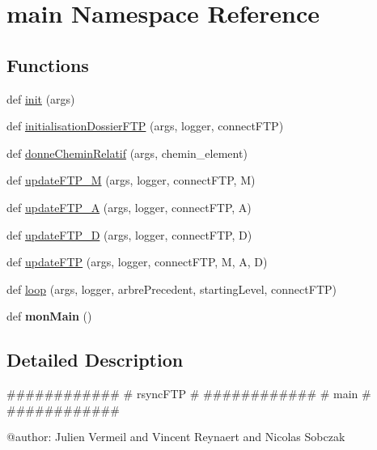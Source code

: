 \hypertarget{namespacemain}{}\section{main Namespace Reference}
\label{namespacemain}
\subsection*{Functions}
\begin{DoxyCompactItemize}
\item 
def \hyperlink{namespacemain_a0e290154722b65ed489c05ccb63123a4}{init} (args)
\item 
def \hyperlink{namespacemain_af2b805eecb08e493981427109e24bfb4}{initialisation\+Dossier\+F\+TP} (args, logger, connect\+F\+TP)
\item 
def \hyperlink{namespacemain_a00446ed819ceb3ba2a2efc386436b91c}{donne\+Chemin\+Relatif} (args, chemin\+\_\+element)
\item 
def \hyperlink{namespacemain_a72891f9d649c2f0889626af662f224d9}{update\+F\+T\+P\+\_\+M} (args, logger, connect\+F\+TP, M)
\item 
def \hyperlink{namespacemain_a0ac30c71ac670b7676d8fcf2a2ee94d0}{update\+F\+T\+P\+\_\+A} (args, logger, connect\+F\+TP, A)
\item 
def \hyperlink{namespacemain_a67671b5a8ef31c164a336616c31866c0}{update\+F\+T\+P\+\_\+D} (args, logger, connect\+F\+TP, D)
\item 
def \hyperlink{namespacemain_a900cc8c3d9f9e1b8b986796482ae5323}{update\+F\+TP} (args, logger, connect\+F\+TP, M, A, D)
\item 
def \hyperlink{namespacemain_a94b514e853b8fc48d9c89f08326fe9b9}{loop} (args, logger, arbre\+Precedent, starting\+Level, connect\+F\+TP)
\item 
def {\bfseries mon\+Main} ()\hypertarget{namespacemain_abc81a2bc9032239e47ace22a92fe0cc6}{}\label{namespacemain_abc81a2bc9032239e47ace22a92fe0cc6}

\end{DoxyCompactItemize}


\subsection{Detailed Description}
\begin{DoxyVerb}############
# rsyncFTP #
############
# main     #
############

@author: Julien Vermeil and Vincent Reynaert and Nicolas Sobczak
\end{DoxyVerb}
 

